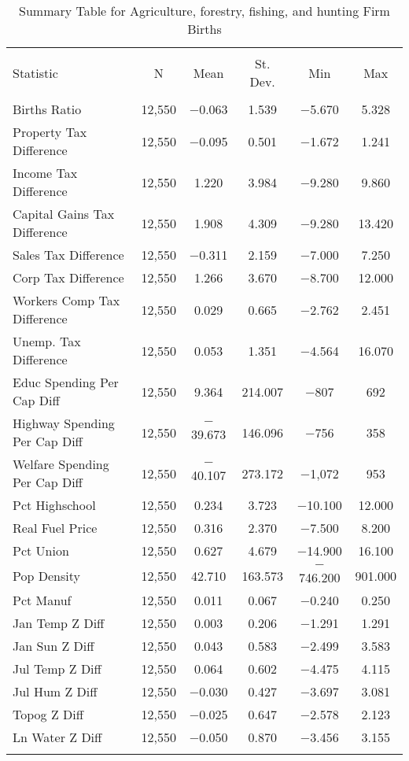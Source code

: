 
\begin{table}[!htbp] \centering 
  \caption{Summary Table for  Agriculture, forestry, fishing, and hunting Firm Births} 
  \label{11summary} 
\begin{tabular}{@{\extracolsep{5pt}}lccccc} 
\\[-1.8ex]\hline 
\hline \\[-1.8ex] 
Statistic & \multicolumn{1}{c}{N} & \multicolumn{1}{c}{Mean} & \multicolumn{1}{c}{St. Dev.} & \multicolumn{1}{c}{Min} & \multicolumn{1}{c}{Max} \\ 
\hline \\[-1.8ex] 
Births Ratio & 12,550 & $-$0.063 & 1.539 & $-$5.670 & 5.328 \\ 
Property Tax Difference & 12,550 & $-$0.095 & 0.501 & $-$1.672 & 1.241 \\ 
Income Tax Difference & 12,550 & 1.220 & 3.984 & $-$9.280 & 9.860 \\ 
Capital Gains Tax Difference & 12,550 & 1.908 & 4.309 & $-$9.280 & 13.420 \\ 
Sales Tax Difference & 12,550 & $-$0.311 & 2.159 & $-$7.000 & 7.250 \\ 
Corp Tax Difference & 12,550 & 1.266 & 3.670 & $-$8.700 & 12.000 \\ 
Workers Comp Tax Difference & 12,550 & 0.029 & 0.665 & $-$2.762 & 2.451 \\ 
Unemp. Tax Difference & 12,550 & 0.053 & 1.351 & $-$4.564 & 16.070 \\ 
Educ Spending Per Cap Diff & 12,550 & 9.364 & 214.007 & $-$807 & 692 \\ 
Highway Spending Per Cap Diff & 12,550 & $-$39.673 & 146.096 & $-$756 & 358 \\ 
Welfare Spending Per Cap Diff & 12,550 & $-$40.107 & 273.172 & $-$1,072 & 953 \\ 
Pct Highschool & 12,550 & 0.234 & 3.723 & $-$10.100 & 12.000 \\ 
Real Fuel Price & 12,550 & 0.316 & 2.370 & $-$7.500 & 8.200 \\ 
Pct Union & 12,550 & 0.627 & 4.679 & $-$14.900 & 16.100 \\ 
Pop Density & 12,550 & 42.710 & 163.573 & $-$746.200 & 901.000 \\ 
Pct Manuf & 12,550 & 0.011 & 0.067 & $-$0.240 & 0.250 \\ 
Jan Temp Z Diff & 12,550 & 0.003 & 0.206 & $-$1.291 & 1.291 \\ 
Jan Sun Z Diff & 12,550 & 0.043 & 0.583 & $-$2.499 & 3.583 \\ 
Jul Temp Z Diff & 12,550 & 0.064 & 0.602 & $-$4.475 & 4.115 \\ 
Jul Hum Z Diff & 12,550 & $-$0.030 & 0.427 & $-$3.697 & 3.081 \\ 
Topog Z Diff & 12,550 & $-$0.025 & 0.647 & $-$2.578 & 2.123 \\ 
Ln Water Z Diff & 12,550 & $-$0.050 & 0.870 & $-$3.456 & 3.155 \\ 
\hline \\[-1.8ex] 
\end{tabular} 
\end{table} 
